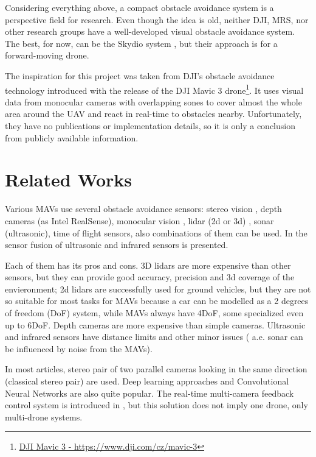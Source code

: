 Considering everything above, a compact obstacle avoidance system is a perspective field for research. 
Even though the idea is old, neither DJI, MRS, nor other research groups have a well-developed visual obstacle avoidance system. 
The best, for now, can be the Skydio system , but their approach is for a forward-moving drone.

The inspiration for this project was taken from DJI's obstacle avoidance technology introduced with the release of the DJI Mavic 3 drone\footnote{\href{https://www.dji.com/cz/mavic-3}{DJI Mavic 3 - https://www.dji.com/cz/mavic-3}}. 
It uses visual data from monocular cameras with overlapping sones to cover almost the whole area around the UAV and react in real-time to obstacles nearby. 
Unfortunately, they have no publications or implementation details, so it is only a conclusion from publicly available information.

\section{Related Works}
Various MAVs use several obstacle avoidance sensors: stereo vision \cite{Ruf2018}, depth cameras (as Intel RealSense), monocular vision \cite{Mejias2010}, lidar (2d or 3d) \cite{Ramasamy2016}, sonar (ultrasonic), time of flight sensors, also combinations of them can be used. 
In \cite{Rambabu2015} the sensor fusion of ultrasonic and infrared sensors is presented.

Each of them has its pros and cons. 
3D lidars are more expensive than other sensors, but they can provide good accuracy, precision and 3d coverage of the envieronment; 2d lidars are successfully used for ground vehicles, but they are not so suitable for most tasks for MAVs because a car can be modelled as a 2 degrees of freedom (DoF) system, while MAVs always have 4DoF, some specialized even up to 6DoF. 
Depth cameras are more expensive than simple cameras. Ultrasonic and infrared sensors have distance limits and other minor issues ( a.e. sonar can be influenced by noise from the MAVs). 

In most articles, stereo pair of two parallel cameras looking in the same direction (classical stereo pair) \cite{Yu2018, Lin2021, Xiao2019} are used.
Deep learning approaches \cite{Back2020, FragaLamas2019, Park2020, Roghair2021} and Convolutional Neural Networks \cite{Yu2013, Ma2020} are also quite popular.
The real-time multi-camera feedback control system is introduced in \cite{He2021}, but this solution does not imply one drone, only multi-drone systems.

